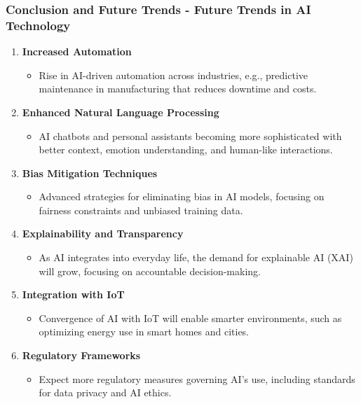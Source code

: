 \documentclass[aspectratio=169]{beamer}
\begin{document}
\begin{frame}[fragile]
    \frametitle{Conclusion and Future Trends - Future Trends in AI Technology}

    \begin{enumerate}
        \item \textbf{Increased Automation}
        \begin{itemize}
            \item Rise in AI-driven automation across industries, e.g., predictive maintenance in manufacturing that reduces downtime and costs.
        \end{itemize}

        \item \textbf{Enhanced Natural Language Processing}
        \begin{itemize}
            \item AI chatbots and personal assistants becoming more sophisticated with better context, emotion understanding, and human-like interactions.
        \end{itemize}

        \item \textbf{Bias Mitigation Techniques}
        \begin{itemize}
            \item Advanced strategies for eliminating bias in AI models, focusing on fairness constraints and unbiased training data.
        \end{itemize}
        
        \item \textbf{Explainability and Transparency}
        \begin{itemize}
            \item As AI integrates into everyday life, the demand for explainable AI (XAI) will grow, focusing on accountable decision-making.
        \end{itemize}

        \item \textbf{Integration with IoT}
        \begin{itemize}
            \item Convergence of AI with IoT will enable smarter environments, such as optimizing energy use in smart homes and cities.
        \end{itemize}
        
        \item \textbf{Regulatory Frameworks}
        \begin{itemize}
            \item Expect more regulatory measures governing AI's use, including standards for data privacy and AI ethics.
        \end{itemize}
    \end{enumerate}
\end{frame}
\end{document}
